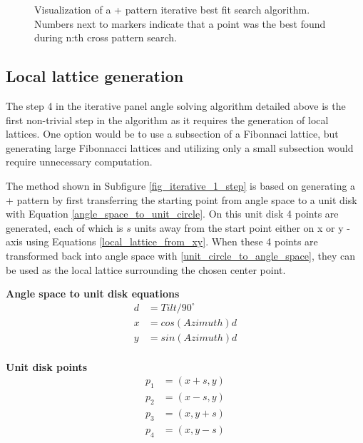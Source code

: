 \begin{figure}[H]
     
\caption{Visualization of a + pattern iterative best fit search algorithm. Numbers next to markers indicate that a point was the best found during n:th cross pattern search.
}
     \label{fig_iterative_visual_1}
\end{figure}

\newpage

\subsection{Local lattice generation}
The step 4 in the iterative panel angle solving algorithm detailed above is the first non-trivial step in the algorithm as it requires the generation of local lattices. One option would be to use a subsection of a Fibonnaci lattice, but generating large Fibonnacci lattices and utilizing only a small subsection would require unnecessary computation. 

The method shown in Subfigure \ref{fig_iterative_1_step} is based on generating a + pattern by first transferring the starting point from angle space to a unit disk with Equation \ref{angle_space_to_unit_circle}. On this unit disk 4 points are generated, each of which is $s$ units away from the start point either on x or y -axis using Equations \ref{local_lattice_from_xy}. When these 4 points are transformed back into angle space with \ref{unit_circle_to_angle_space}, they can be used as the local lattice surrounding the chosen center point.

\noindent \textbf{Angle space to unit disk equations}
\begin{equation}
\begin{split}
\label{angle_space_to_unit_circle}
d &= Tilt/90^\circ \\
x &= cos(Azimuth)d \\
y &= sin(Azimuth)d \\
\end{split}
\end{equation}


\noindent \textbf{Unit disk points}
\begin{equation}
\begin{split}
\label{local_lattice_from_xy}
p_1 &= (x+s,y) \\
p_2 &= (x-s,y) \\
p_3 &= (x,y+s) \\
p_4 &= (x,y-s) \\
\end{split}
\end{equation}

